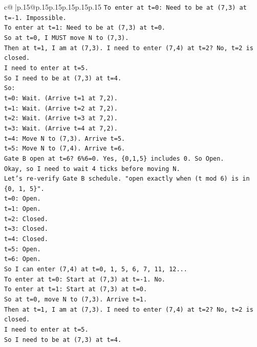 \documentclass{article}
\begin{document}
{\begin{supertabular}{c@{$\;$}|p{.15\linewidth}@{}p{.15\linewidth}p{.15\linewidth}p{.15\linewidth}p{.15\linewidth}p{.15\linewidth}}
{{{\texttt{To enter at t=0: Need to be at (7,3) at t={-}1. Impossible.} \\
\texttt{To enter at t=1: Need to be at (7,3) at t=0.} \\
\texttt{So at t=0, I MUST move N to (7,3).} \\
\texttt{Then at t=1, I am at (7,3). I need to enter (7,4) at t=2? No, t=2 is closed.} \\
\texttt{I need to enter at t=5.} \\
\texttt{So I need to be at (7,3) at t=4.} \\
\texttt{So:} \\
\texttt{t=0: Wait. (Arrive t=1 at 7,2).} \\
\texttt{t=1: Wait. (Arrive t=2 at 7,2).} \\
\texttt{t=2: Wait. (Arrive t=3 at 7,2).} \\
\texttt{t=3: Wait. (Arrive t=4 at 7,2).} \\
\texttt{t=4: Move N to (7,3). Arrive t=5.} \\
\texttt{t=5: Move N to (7,4). Arrive t=6.} \\
\texttt{Gate B open at t=6? 6\%6=0. Yes, \{0,1,5\} includes 0. So Open.} \\
\texttt{Okay, so I need to wait 4 ticks before moving N.} \\
\texttt{Let's re{-}verify Gate B schedule. "open exactly when (t mod 6) is in \{0, 1, 5\}".} \\
\texttt{t=0: Open.} \\
\texttt{t=1: Open.} \\
\texttt{t=2: Closed.} \\
\texttt{t=3: Closed.} \\
\texttt{t=4: Closed.} \\
\texttt{t=5: Open.} \\
\texttt{t=6: Open.} \\
\texttt{So I can enter (7,4) at t=0, 1, 5, 6, 7, 11, 12...} \\
\texttt{To enter at t=0: Start at (7,3) at t={-}1. No.} \\
\texttt{To enter at t=1: Start at (7,3) at t=0.} \\
\texttt{So at t=0, move N to (7,3). Arrive t=1.} \\
\texttt{Then at t=1, I am at (7,3). I need to enter (7,4) at t=2? No, t=2 is closed.} \\
\texttt{I need to enter at t=5.} \\
\texttt{So I need to be at (7,3) at t=4.} \\
}}}
\end{supertabular}}
\end{document}
